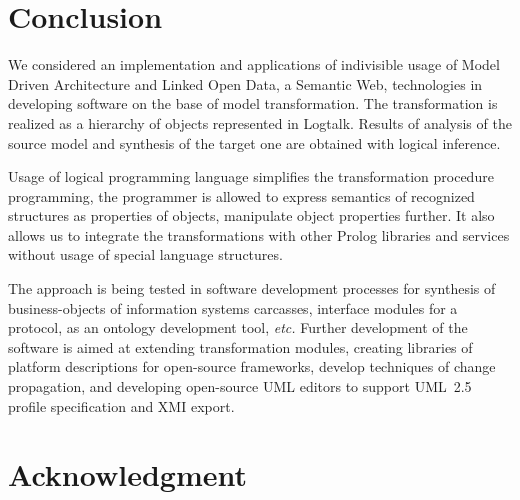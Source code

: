 \documentclass[runningheads]{llncs}
\begin{document}
\section{Conclusion}

We considered an implementation and applications of indivisible usage of Model Driven Architecture and Linked Open Data, a Semantic Web, technologies in developing software on the base of model transformation.  The transformation is realized as a hierarchy of objects represented in Logtalk.  Results of analysis of the source model and synthesis of the target one are obtained with logical inference.

Usage of logical programming language simplifies the transformation procedure programming, the programmer is allowed to express semantics of recognized structures as properties of objects, manipulate object properties further. It also allows us to integrate the transformations with other Prolog libraries and services without usage of special language structures.

The approach is being tested in software development processes for synthesis of business-objects of information systems carcasses, interface modules for a protocol, as an ontology development tool, \emph{etc.} Further development of the software is aimed at extending transformation modules, creating libraries of platform descriptions for open-source frameworks, develop techniques of change propagation, and developing open-source UML editors to support UML~2.5 profile specification \cite{uml25} and XMI export.


\section*{Acknowledgment}
\end{document}
